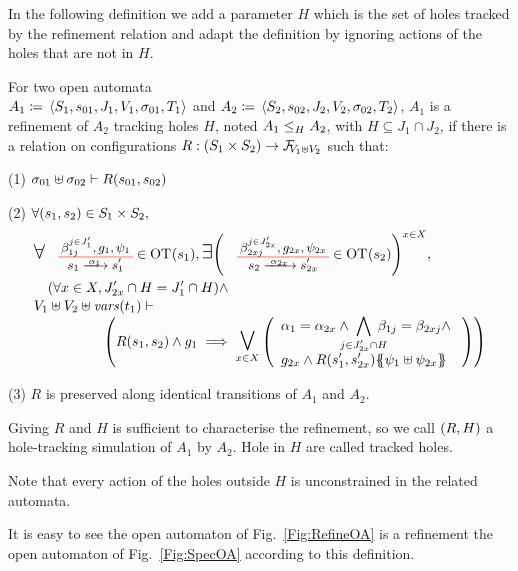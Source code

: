 \documentclass[runningheads]{llncs}
\begin{document}
In the following definition we add a parameter $H$ which is the set of holes tracked by the refinement relation and adapt the definition by ignoring actions of the holes that are not in $H$.
\begin{definition}\label{Def:OA-Refinement}
For two open automata\\ \(A_1 \defobject \OA{S_1}{s_{01}}{J_1}{V_1}{\sigma_{01}}{T_1}\) and \(A_2 \defobject \OA{S_2}{s_{02}}{J_2}{V_2}{\sigma_{02}}{T_2}\), \(A_1\) is a refinement of \(A_2\) tracking holes \(H\), noted \(\wrel{A_1}{A_2}{H}\), with \(H \subseteq J_1 \cap J_2\), if there is a relation on configurations $R: \mpar{S_1 \times S_2} \to \rformulas[V_1 \uplus V_2]$ such that:
\item[(1)] \(\sigma_{01} \uplus \sigma_{02} \vdash R\mpar{s_{01}, s_{02}}\)
\item[(2)] \(\forall \mpar{s_1, s_2} \in S_1 \times S_2,\)
\begin{multline*}
	\everymath{\displaystyle}\begin{array}{l}
		\bigsymb{\forall} \OTx{1}{}{1}{1} \in \fOT{s_1}, \bigsymb{\exists} \mpar{\OTx{2}{x}{2x}{2x} \in \fOT{s_2}}^{x \in X}, \\[12pt]
		\quad \mpar{\forall x \in X, J'_{2x} \cap H = J'_1 \cap H} \nwedge\\[1pt]
		 V_1 \uplus V_2 \uplus \fvars{t_1} \vdash\\\hspace{5em} \mpar{R\mpar{s_1, s_2} \wedge g_1 \implies \operatorname*{\bigsymb{\bigvee}}_{x \in X} \mpar{\begin{array}{l}
			\alpha_1 = \alpha_{2x} \wedge \bigwedge_\subbox{j \in J'_{2x} \cap H} \beta_{1j} = \beta_{2xj}   \nwedge\\
			 g_{2x} \wedge R\mpar{s'_1, s'_{2x}}\psubst{\psi_1 \uplus \psi_{2x}}
		\end{array}}} 
	\end{array} 
\end{multline*}
\item[(3)] $R$ is preserved along identical transitions of \(A_1\) and \(A_2\).

Giving \(R\) and \(H\) is sufficient to characterise the refinement, so we call \(\mpar{R, H}\) a hole-tracking simulation of \(A_1\) by \(A_2\).
Hole in \(H\) are called tracked holes.
\end{definition}
Note that every action of the holes outside \(H\) is unconstrained in the related automata. 

\begin{example} It is easy to see the  open automaton of Fig.~\ref{Fig:RefineOA} is a refinement the open automaton of Fig.~\ref{Fig:SpecOA} according to this definition.
\end{example}
\end{document}
